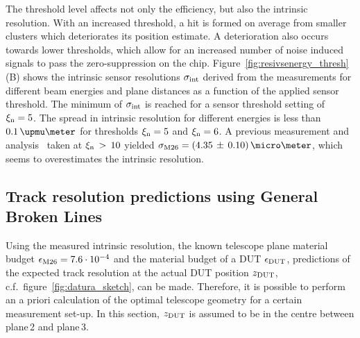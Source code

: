 The threshold level affects not only the efficiency, but also the intrinsic resolution. 
With an increased threshold, a hit is formed on average from smaller clusters which deteriorates its position estimate. 
A deterioration also occurs towards lower thresholds, which allow for an increased number of noise induced signals to pass the zero-suppression on the chip.
Figure~\ref{fig:resivsenergy_thresh} (B) shows the intrinsic sensor resolutions $\sigma_{\textrm{int}}$ derived from the measurements for different beam energies and plane distances as a function of the applied sensor threshold.
The minimum of $\sigma_{\textrm{int}}$ is reached for a sensor threshold setting of $\xi_{\textrm{n}} = 5$.
The spread in intrinsic resolution for different energies is less than $0.1\,\upmu\meter$ for thresholds $\xi_{\textrm{n}} = 5$ and $\xi_{\textrm{n}} = 6$. 
A previous measurement and analysis~\cite{ref:j.behrmeasurements} taken at $\xi_{\textrm{n}}\,>\,10$ yielded $\sigma_{\textrm{M26}} = (4.35\,\pm\,0.10)\,\micro\meter$,
 which seems to overestimates the intrinsic resolution. 



\subsection{Track resolution predictions using General Broken Lines}

% 
Using the measured intrinsic resolution, the known telescope plane material budget $\mathnormal{\epsilon_{\textrm{M26}}} = 7.6\cdot 10^{-4}$ and the material budget of a DUT $\mathnormal{\epsilon_{\textrm{DUT}}}$,
 predictions of the expected track resolution at the actual DUT position $z_{\textrm{DUT}}$, c.f.\ figure~\ref{fig:datura_sketch}, can be made.
Therefore, it is possible to perform an a priori calculation of the optimal telescope geometry for a certain measurement set-up. 
In this section, $z_{\textrm{DUT}}$ is assumed to be in the centre between plane\,2 and plane\,3.

